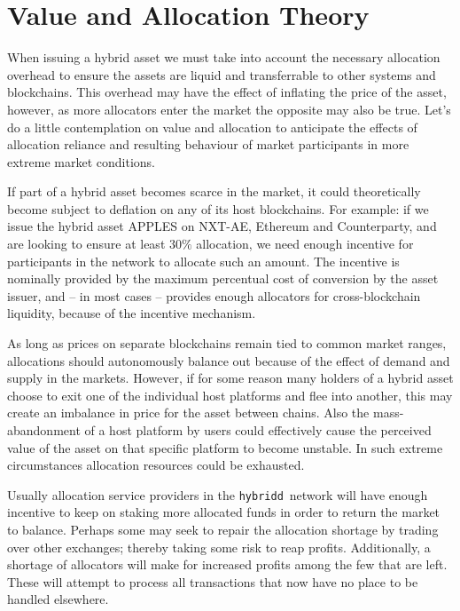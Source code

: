 \documentclass[a4paper,fullpack]{article}
\newcommand{\hybridd}{\texttt{hybridd}\, }
\begin{document}
\section{Value and Allocation Theory}

When issuing a hybrid asset we must take into account the necessary allocation overhead to ensure the assets are liquid and transferrable to other systems and blockchains. This overhead may have the effect of inflating the price of the asset, however, as more allocators enter the market the opposite may also be true. Let's do a little contemplation on value and allocation to anticipate the effects of allocation reliance and resulting behaviour of market participants in more extreme market conditions.

If part of a hybrid asset becomes scarce in the market, it could theoretically become subject to deflation on any of its host blockchains. For example: if we issue the hybrid asset APPLES on NXT-AE, Ethereum and Counterparty\cite{counterparty}, and are looking to ensure at least $30\%$ allocation, we need enough incentive for participants in the network to allocate such an amount. The incentive is nominally provided by the maximum percentual cost of conversion by the asset issuer, and – in most cases – provides enough allocators for cross-blockchain liquidity, because of the incentive mechanism.

As long as prices on separate blockchains remain tied to common market ranges, allocations should autonomously balance out because of the effect of demand and supply in the markets. However, if for some reason many holders of a hybrid asset choose to exit one of the individual host platforms and flee into another, this may create an imbalance in price for the asset between chains. Also the mass-abandonment of a host platform by users could effectively cause the perceived value of the asset on that specific platform to become unstable. In such extreme circumstances allocation resources could be exhausted.

Usually allocation service providers in the \hybridd network will have enough incentive to keep on staking more allocated funds in order to return the market to balance. Perhaps some may seek to repair the allocation shortage by trading over other exchanges; thereby taking some risk to reap profits. Additionally, a shortage of allocators will make for increased profits among the few that are left. These will attempt to process all transactions that now have no place to be handled elsewhere.
\end{document}
